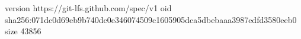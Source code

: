 version https://git-lfs.github.com/spec/v1
oid sha256:071dc0d69eb9b740dc0e346074509c1605905dca5dbebaaa3987edfd3580eeb0
size 43856
